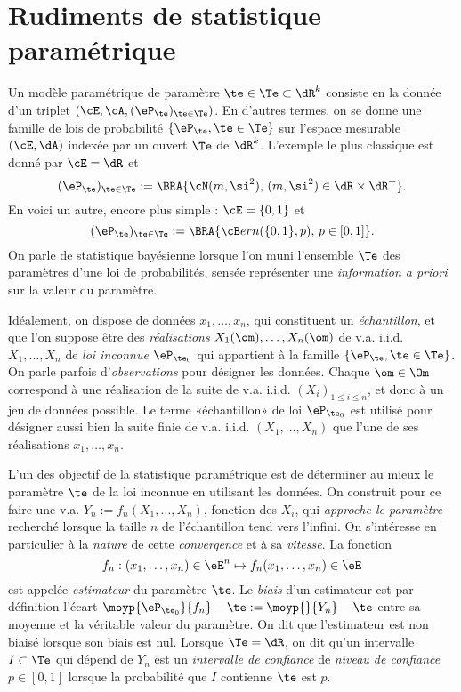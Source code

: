 %
\section{Rudiments de statistique paramétrique}
%

Un modèle paramétrique de paramètre $\te\in\Te\subset\dR^k$ consiste en la donnée d'un
triplet $(\cE,\cA,(\eP_\te)_{\te\in\Te})$. En d'autres termes, on se donne une
famille de lois de probabilité $\{\eP_\te,\te\in\Te\}$ sur l'espace mesurable
$(\cE,\dA)$ indexée par un ouvert $\Te$ de $\dR^k$. L'exemple le plus
classique est donné par $\cE=\dR$ et
$$
(\eP_\te)_{\te\in\Te}:=\BRA{\cN(m,\si^2),\,(m,\si^2)\in\dR\times\dR^+}.
$$
En voici un autre, encore plus simple : $\cE=\{0,1\}$ et
$$
(\eP_\te)_{\te\in\Te}:=\BRA{{\cB}ern(\{0,1\},p),\,p\in[0,1]}.
$$
On parle de statistique bayésienne lorsque l'on muni l'ensemble $\Te$ des
paramètres d'une loi de probabilités, sensée représenter une \emph{information
  a priori} sur la valeur du paramètre.

Idéalement, on dispose de données $x_1,\ldots,x_n$, qui constituent un
\emph{échantillon}, et que l'on suppose être des \emph{réalisations}
$X_1(\om),\ldots,X_n(\om)$ de v.a. i.i.d. $X_1,\ldots,X_n$ de \emph{loi inconnue}
$\eP_{\te_0}$ qui appartient à la famille $\{\eP_\te,\te\in\Te\}$. On parle
parfois d'\emph{observations} pour désigner les données. Chaque $\om\in\Om$
correspond à une réalisation de la suite de v.a. i.i.d. $(X_i)_{1\leq i\leq n}$, et
donc à un jeu de données possible. Le terme «échantillon» de loi $\eP_{\te_0}$
est utilisé pour désigner aussi bien la suite finie de v.a. i.i.d.
$(X_1,\ldots,X_n)$ que l'une de ses réalisations $x_1,\ldots,x_n$.

L'un des objectif de la statistique paramétrique est de déterminer au mieux le
paramètre $\te$ de la loi inconnue en utilisant les données. On construit pour
ce faire une v.a. $Y_n:=f_n(X_1,\ldots,X_n)$, fonction des $X_i$, qui
\emph{approche le paramètre} recherché lorsque la taille $n$ de l'échantillon
tend vers l'infini. On s'intéresse en particulier à la \emph{nature} de cette
\emph{convergence} et à sa \emph{vitesse}.  La fonction
$$
f_n:(x_1,\ldots,x_n)\in\eE^n\mapsto f_n(x_1,\ldots,x_n)\in\eE
$$
est appelée \emph{estimateur} du paramètre $\te$. Le \emph{biais} d'un
estimateur est par définition l'écart
$\moyp{\eP_{\te_0}}{f_n}-\te:=\moyp{}{Y_n}-\te$ entre sa moyenne et la véritable
valeur du paramètre.  On dit que l'estimateur est non biaisé lorsque son biais
est nul. Lorsque $\Te=\dR$, on dit qu'un intervalle $I\subset\Te$ qui dépend de
$Y_n$ est un \emph{intervalle de confiance} de \emph{niveau de confiance}
$p\in[0,1]$ lorsque la probabilité que $I$ contienne $\te$ est $p$.

